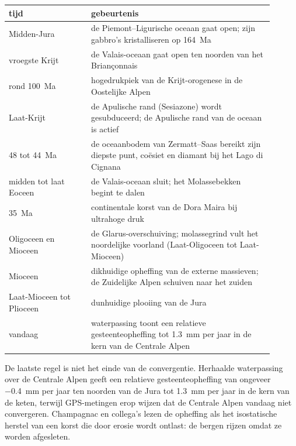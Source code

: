 \begin{omfigure}
\centering\small
\begin{tabular}{p{0.28\linewidth}|p{0.62\linewidth}}
tijd & gebeurtenis \\ \hline
Midden-Jura & de Piemont--Ligurische oceaan gaat open; zijn gabbro's kristalliseren op
\qty{164}{Ma} \\
vroegste Krijt & de Valais-oceaan gaat open ten noorden van het Briançonnais \\
rond \qty{100}{Ma} & hogedrukpiek van de Krijt-orogenese in de Oostelijke Alpen \\
Laat-Krijt & de Apulische rand (Sesiazone) wordt gesubduceerd; de Apulische rand van de
oceaan is actief \\
48 tot \qty{44}{Ma} & de oceaanbodem van Zermatt--Saas bereikt zijn diepste punt, coësiet en
diamant bij het Lago di Cignana \\
midden tot laat Eoceen & de Valais-oceaan sluit; het Molassebekken begint te dalen \\
\qty{35}{Ma} & continentale korst van de Dora Maira bij ultrahoge druk \\
Oligoceen en Mioceen & de Glarus-overschuiving; molassegrind vult het noordelijke voorland
(Laat-Oligoceen tot Laat-Mioceen) \\
Mioceen & dikhuidige opheffing van de externe massieven; de Zuidelijke Alpen schuiven
naar het zuiden \\
Laat-Mioceen tot Plioceen & dunhuidige plooiing van de Jura \\
vandaag & waterpassing toont een relatieve gesteenteopheffing tot \qty{1.3}{mm} per jaar in de kern van
de Centrale Alpen
\end{tabular}
\par{}
\end{omfigure}

De laatste regel is niet het einde van de convergentie. Herhaalde waterpassing over de Centrale Alpen
geeft een relatieve gesteenteopheffing van ongeveer \qty{-0.4}{mm} per jaar ten noorden van de Jura tot
\qty{1.3}{mm} per jaar in de kern van de keten, terwijl GPS-metingen erop wijzen dat de
Centrale Alpen vandaag niet convergeren. Champagnac en collega's lezen de opheffing als het isostatische herstel van een
korst die door erosie wordt ontlast: de bergen rijzen omdat ze worden afgesleten.

